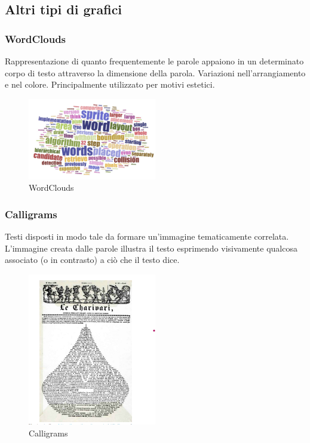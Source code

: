 \subsection{Altri tipi di grafici}
\subsubsection{WordClouds}
Rappresentazione di quanto frequentemente le parole appaiono in un determinato corpo di testo attraverso la dimensione della parola. 
Variazioni nell'arrangiamento e nel colore.
Principalmente utilizzato per motivi estetici.
\begin{figure}[H]
    \centering
    \includegraphics[width=0.5\textwidth]{images/WordClouds.png} 
    \caption{WordClouds}
    \label{fig:immagine}
\end{figure}
\subsubsection{Calligrams}
Testi disposti in modo tale da formare un'immagine tematicamente correlata.
L'immagine creata dalle parole illustra il testo esprimendo visivamente qualcosa associato (o in contrasto) a ciò che il testo dice.
\begin{figure}[H]
    \centering
    \includegraphics[width=0.5\textwidth]{images/Calligrams.png} 
    \caption{Calligrams}
    \label{fig:immagine}
\end{figure}

